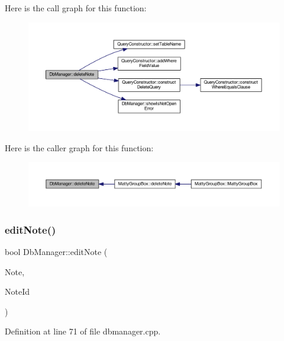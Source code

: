Here is the call graph for this function\+:
\nopagebreak
\begin{figure}[H]
\begin{center}
\leavevmode
\includegraphics[width=350pt]{classDbManager_a164849758fd05445c7af2cc04fc3569f_cgraph}
\end{center}
\end{figure}
Here is the caller graph for this function\+:
\nopagebreak
\begin{figure}[H]
\begin{center}
\leavevmode
\includegraphics[width=350pt]{classDbManager_a164849758fd05445c7af2cc04fc3569f_icgraph}
\end{center}
\end{figure}
\hypertarget{classDbManager_af27c0367d70db496305ec5cab6324fe9}{}\label{classDbManager_af27c0367d70db496305ec5cab6324fe9} 
\subsubsection{\texorpdfstring{edit\+Note()}{editNote()}}
{\footnotesize\ttfamily bool Db\+Manager\+::edit\+Note (\begin{DoxyParamCaption}\item[{\hyperlink{classMattyNote}{Matty\+Note} \&}]{Note,  }\item[{int}]{Note\+Id }\end{DoxyParamCaption})\hspace{0.3cm}{\ttfamily [static]}}



Definition at line 71 of file dbmanager.\+cpp.

